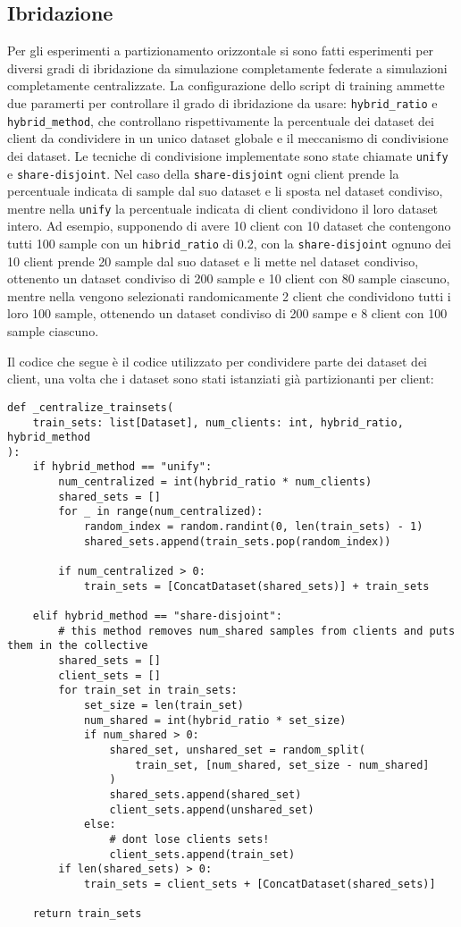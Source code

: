 \subsection{Ibridazione}
Per gli esperimenti a partizionamento orizzontale si sono fatti 
esperimenti per diversi gradi di ibridazione da simulazione completamente
federate a simulazioni completamente centralizzate. La configurazione 
dello script di training ammette due paramerti per controllare il grado 
di ibridazione da usare: \texttt{hybrid\_ratio} e 
\texttt{hybrid\_method}, che controllano
rispettivamente la percentuale dei dataset dei client da condividere in 
un unico dataset globale e il meccanismo di condivisione dei dataset.
Le tecniche di condivisione implementate sono state chiamate \texttt{unify}
e \texttt{share-disjoint}. Nel caso della \texttt{share-disjoint} ogni
client 
prende la percentuale indicata di sample dal suo dataset e li sposta
nel dataset condiviso, mentre nella \texttt{unify} la percentuale 
indicata di 
client condividono il loro dataset intero. Ad esempio, supponendo di 
avere 10 client con 10 dataset che contengono tutti 100 sample con un 
\texttt{hibrid\_ratio} di 0.2, con la \texttt{share-disjoint} ognuno 
dei 10 client prende
20 sample dal suo dataset e li mette nel dataset condiviso, ottenento 
un dataset condiviso di 200 sample e 10 client con 80 sample ciascuno,
mentre nella  vengono selezionati randomicamente 2 client che 
condividono tutti i loro 100 sample, ottenendo un dataset condiviso di 
200 sampe e 8 client con 100 sample ciascuno.

Il codice che segue è il codice utilizzato per condividere parte dei 
dataset dei client, una volta che i dataset sono stati istanziati già
partizionanti per client:

\begin{lstlisting}
def _centralize_trainsets(
    train_sets: list[Dataset], num_clients: int, hybrid_ratio, hybrid_method
):
    if hybrid_method == "unify":
        num_centralized = int(hybrid_ratio * num_clients)
        shared_sets = []
        for _ in range(num_centralized):
            random_index = random.randint(0, len(train_sets) - 1)
            shared_sets.append(train_sets.pop(random_index))

        if num_centralized > 0:
            train_sets = [ConcatDataset(shared_sets)] + train_sets

    elif hybrid_method == "share-disjoint":
        # this method removes num_shared samples from clients and puts them in the collective
        shared_sets = []
        client_sets = []
        for train_set in train_sets:
            set_size = len(train_set)
            num_shared = int(hybrid_ratio * set_size)
            if num_shared > 0:
                shared_set, unshared_set = random_split(
                    train_set, [num_shared, set_size - num_shared]
                )
                shared_sets.append(shared_set)
                client_sets.append(unshared_set)
            else:
                # dont lose clients sets!
                client_sets.append(train_set)
        if len(shared_sets) > 0:
            train_sets = client_sets + [ConcatDataset(shared_sets)]

    return train_sets
\end{lstlisting}
